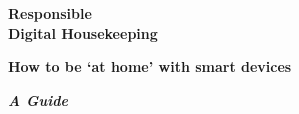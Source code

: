 \documentclass[10pt,nocombine]{leaflet}
\begin{document}
\pagestyle{plain}
\thispagestyle{empty}

\begin{center}
    \onehalfspacing
   \color{black} \huge\textbf{Responsible \\ Digital Housekeeping}
\end{center}


\vfill
\begin{center}
\color{black}\fontsize{80}{80}\faGroup    
\end{center}




\begin{center}
\singlespacing
\fontsize{40}{40}\selectfont \color{black}\bfseries How to be `at home' with smart devices
\end{center}

\vfill

\begin{center}
\onehalfspacing
\huge \bfseries \itshape A Guide\\[2ex]
\fontsize{40}{40}\faHandORight
\end{center}

\clearpage
\end{document}
